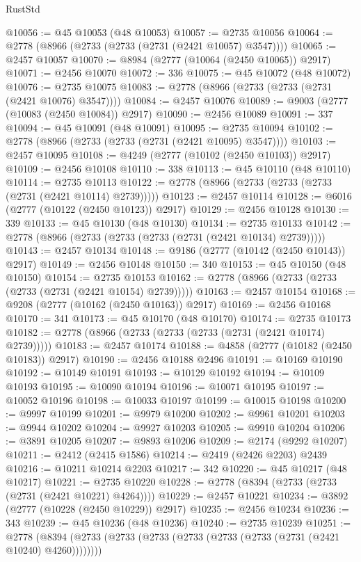 \begin{lexlean}{RustStd}
\begin{coremodule}
@10056 := @45 @10053 (@48 @10053)
@10057 := @2735 @10056
@10064 := @2778 (@8966 (@2733 (@2733 (@2731 (@2421 @10057) @3547))))
@10065 := @2457 @10057
@10070 := @8984 (@2777 (@10064 (@2450 @10065)) @2917)
@10071 := @2456 @10070
@10072 := 336
@10075 := @45 @10072 (@48 @10072)
@10076 := @2735 @10075
@10083 := @2778 (@8966 (@2733 (@2733 (@2731 (@2421 @10076) @3547))))
@10084 := @2457 @10076
@10089 := @9003 (@2777 (@10083 (@2450 @10084)) @2917)
@10090 := @2456 @10089
@10091 := 337
@10094 := @45 @10091 (@48 @10091)
@10095 := @2735 @10094
@10102 := @2778 (@8966 (@2733 (@2733 (@2731 (@2421 @10095) @3547))))
@10103 := @2457 @10095
@10108 := @4249 (@2777 (@10102 (@2450 @10103)) @2917)
@10109 := @2456 @10108
@10110 := 338
@10113 := @45 @10110 (@48 @10110)
@10114 := @2735 @10113
@10122 := @2778 (@8966 (@2733 (@2733 (@2733 (@2731 (@2421 @10114) @2739)))))
@10123 := @2457 @10114
@10128 := @6016 (@2777 (@10122 (@2450 @10123)) @2917)
@10129 := @2456 @10128
@10130 := 339
@10133 := @45 @10130 (@48 @10130)
@10134 := @2735 @10133
@10142 := @2778 (@8966 (@2733 (@2733 (@2733 (@2731 (@2421 @10134) @2739)))))
@10143 := @2457 @10134
@10148 := @9186 (@2777 (@10142 (@2450 @10143)) @2917)
@10149 := @2456 @10148
@10150 := 340
@10153 := @45 @10150 (@48 @10150)
@10154 := @2735 @10153
@10162 := @2778 (@8966 (@2733 (@2733 (@2733 (@2731 (@2421 @10154) @2739)))))
@10163 := @2457 @10154
@10168 := @9208 (@2777 (@10162 (@2450 @10163)) @2917)
@10169 := @2456 @10168
@10170 := 341
@10173 := @45 @10170 (@48 @10170)
@10174 := @2735 @10173
@10182 := @2778 (@8966 (@2733 (@2733 (@2733 (@2731 (@2421 @10174) @2739)))))
@10183 := @2457 @10174
@10188 := @4858 (@2777 (@10182 (@2450 @10183)) @2917)
@10190 := @2456 @10188 @2496
@10191 := @10169 @10190
@10192 := @10149 @10191
@10193 := @10129 @10192
@10194 := @10109 @10193
@10195 := @10090 @10194
@10196 := @10071 @10195
@10197 := @10052 @10196
@10198 := @10033 @10197
@10199 := @10015 @10198
@10200 := @9997 @10199
@10201 := @9979 @10200
@10202 := @9961 @10201
@10203 := @9944 @10202
@10204 := @9927 @10203
@10205 := @9910 @10204
@10206 := @3891 @10205
@10207 := @9893 @10206
@10209 := @2174 (@9292 @10207)
@10211 := @2412 (@2415 @1586)
@10214 := @2419 (@2426 @2203) @2439
@10216 := @10211 @10214 @2203
@10217 := 342
@10220 := @45 @10217 (@48 @10217)
@10221 := @2735 @10220
@10228 := @2778 (@8394 (@2733 (@2733 (@2731 (@2421 @10221) @4264))))
@10229 := @2457 @10221
@10234 := @3892 (@2777 (@10228 (@2450 @10229)) @2917)
@10235 := @2456 @10234
@10236 := 343
@10239 := @45 @10236 (@48 @10236)
@10240 := @2735 @10239
@10251 := @2778 (@8394 (@2733 (@2733 (@2733 (@2733 (@2733 (@2733 (@2731 (@2421 @10240) @4260))))))))

\end{coremodule}
\end{lexlean}
